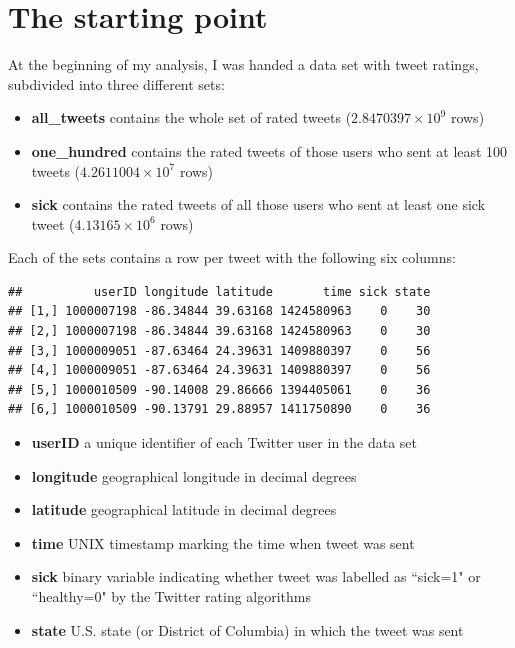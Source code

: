 \documentclass[11pt, a4paper,twoside]{report}\usepackage[]{graphicx}\usepackage[]{color}
\makeatletter
\newenvironment{kframe}{%
 \def\at@end@of@kframe{}%
 \ifinner\ifhmode%
  \def\at@end@of@kframe{\end{minipage}}%
  \begin{minipage}{\columnwidth}%
 \fi\fi%
 \def\FrameCommand##1{\hskip\@totalleftmargin \hskip-\fboxsep
 \colorbox{shadecolor}{##1}\hskip-\fboxsep
     \hskip-\linewidth \hskip-\@totalleftmargin \hskip\columnwidth}%
 \MakeFramed {\advance\hsize-\width
   \@totalleftmargin\z@ \linewidth\hsize
   \@setminipage}}%
 {\par\unskip\endMakeFramed%
 \at@end@of@kframe}
\newenvironment{knitrout}{}{} %
\makeatother
\begin{document}
\section{The starting point}

At the beginning of my analysis, I was handed a data set with tweet ratings, subdivided into three different sets: 

\begin{itemize}
  \item \textbf{all\_tweets} contains the whole set of rated tweets (\ensuremath{2.8470397\times 10^{9}} rows)
  \item \textbf{one\_hundred} contains the rated tweets of those users who sent at least 100 tweets (\ensuremath{4.2611004\times 10^{7}} rows)
  \item \textbf{sick} contains the rated tweets of all those users who sent at least one sick tweet (\ensuremath{4.13165\times 10^{6}} rows)
\end{itemize}

Each of the sets contains a row per tweet with the following six columns: 

\begin{knitrout}
\color{fgcolor}\begin{kframe}
\begin{verbatim}
##          userID longitude latitude       time sick state
## [1,] 1000007198 -86.34844 39.63168 1424580963    0    30
## [2,] 1000007198 -86.34844 39.63168 1424580963    0    30
## [3,] 1000009051 -87.63464 24.39631 1409880397    0    56
## [4,] 1000009051 -87.63464 24.39631 1409880397    0    56
## [5,] 1000010509 -90.14008 29.86666 1394405061    0    36
## [6,] 1000010509 -90.13791 29.88957 1411750890    0    36
\end{verbatim}
\end{kframe}
\end{knitrout}

\begin{itemize}
  \item \textbf{userID} a unique identifier of each Twitter user in the data set
  \item \textbf{longitude} geographical longitude in decimal degrees
  \item \textbf{latitude} geographical latitude in decimal degrees
  \item \textbf{time} UNIX timestamp marking the time when tweet was sent
  \item \textbf{sick} binary variable indicating whether tweet was labelled as ``sick=1" or ``healthy=0" by the Twitter rating algorithms
  \item \textbf{state} U.S. state (or District of Columbia) in which the tweet was sent
\end{itemize}
\end{document}
